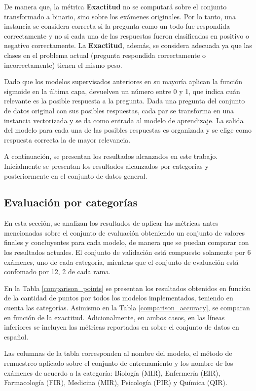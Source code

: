 De manera que, la métrica \textbf{Exactitud} no se computará sobre el conjunto transformado a binario, sino sobre los exámenes originales. Por lo tanto, una instancia se considera correcta si la pregunta como un todo fue respondida correctamente y no si cada una de las respuestas fueron clasificadas en positivo o negativo correctamente. La \textbf{Exactitud}, además, se considera adecuada ya que las clases en el problema actual (pregunta respondida correctamente o incorrectamente) tienen el mismo peso.

Dado que los modelos supervisados anteriores en su mayoría aplican la función sigmoide en la última capa, devuelven un número entre 0 y 1, que indica cuán relevante es la posible respuesta a la pregunta. Dada una pregunta del conjunto de datos original con sus posibles respuestas, cada par se transforma en una instancia vectorizada y se da como entrada al modelo de aprendizaje. La salida del modelo para cada una de las posibles respuestas es organizada y se elige como respuesta correcta la de mayor relevancia.

A continuación, se presentan los resultados alcanzados en este trabajo. Inicialmente se presentan los resultados alcanzados por categorías y posteriormente en el conjunto de datos general.

\subsection{Evaluación por categorías}

En esta sección, se analizan los resultados de aplicar las métricas antes mencionadas sobre el conjunto de evaluación obteniendo un conjunto de valores finales y concluyentes para cada modelo, de manera que se puedan comparar con los resultados actuales. El conjunto de validación está compuesto solamente por 6 exámenes, uno de cada categoría, mientras que el conjunto de evaluación está confomado por 12, 2 de cada rama.

En la Tabla \ref{comparison_points} se presentan los resultados obtenidos en función de la cantidad de puntos por todos los modelos implementados, teniendo en cuenta las categorías. Asimismo en la Tabla \ref{comparison_accuracy}, se comparan en función de la exactitud. Adicionalmente, en ambos casos, en las líneas inferiores se incluyen las métricas reportadas en \cite{2019-head-qa} sobre el conjunto de datos en español. 

Las columnas de la tabla corresponden al nombre del modelo, el método de remuestreo aplicado sobre el conjunto de entrenamiento y los nombre de los exámenes de acuerdo a la categoría: Biología (MIR), Enfermería (EIR), Farmacología (FIR), Medicina (MIR), Psicología (PIR) y Química (QIR). 

